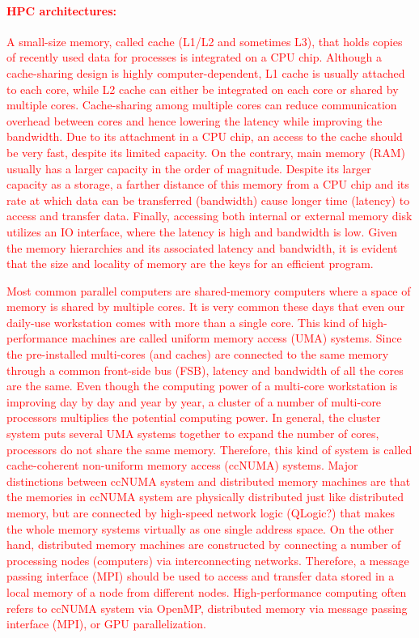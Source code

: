 \documentclass[12pt]{article}
\begin{document}
\textcolor{red}{
\paragraph{HPC architectures:} A small-size memory, called cache (L1/L2 and sometimes L3), that holds copies of recently used data for processes is integrated on a CPU chip. Although a cache-sharing design is highly computer-dependent, L1 cache is usually attached to each core, while L2 cache can either be integrated on each core or shared by multiple cores. Cache-sharing among multiple cores can reduce communication overhead between cores and hence lowering the latency while improving the bandwidth. Due to its attachment in a CPU chip, an access to the cache should be very fast, despite its limited capacity. On the contrary, main memory (RAM) usually has a larger capacity in the order of magnitude. Despite its larger capacity as a storage, a farther distance of this memory from a CPU chip and its rate at which data can be transferred (bandwidth) cause longer time (latency) to access and transfer data. Finally, accessing both internal or external memory disk utilizes an IO interface, where the latency is high and bandwidth is low. Given the memory hierarchies and its associated latency and bandwidth, it is evident that the size and locality of memory are the keys for an efficient program.
}

\textcolor{red}{
Most common parallel computers are shared-memory computers where a space of memory is shared by multiple cores. It is very common these days that even our daily-use workstation comes with more than a single core. This kind of high-performance machines are called uniform memory access (UMA) systems. Since the pre-installed multi-cores (and caches) are connected to the same memory through a common front-side bus (FSB), latency and bandwidth of all the cores are the same. Even though the computing power of a multi-core workstation is improving day by day and year by year, a cluster of a number of multi-core processors multiplies the potential computing power. In general, the cluster system puts several UMA systems together to expand the number of cores, processors do not share the same memory. Therefore, this kind of system is called cache-coherent non-uniform memory access (ccNUMA) systems. Major distinctions between ccNUMA system and distributed memory machines are that the memories in ccNUMA system are physically distributed just like distributed memory, but are connected by high-speed network logic (QLogic?) that makes the whole memory systems virtually as one single address space. On the other hand, distributed memory machines are constructed by connecting a number of processing nodes (computers) via interconnecting networks. Therefore, a message passing interface (MPI) should be used to access and transfer data stored in a local memory of a node from different nodes. High-performance computing often refers to ccNUMA system via OpenMP, distributed memory via message passing interface (MPI), or GPU parallelization.
}
\end{document}
